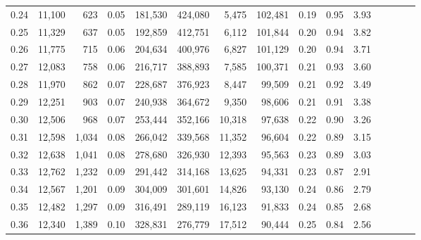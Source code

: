 \begin{tabular}{rrrcrrrrrrrrrrr}
0.24 &  11,100 &    623 &                                       0.05 &  181,530 &  424,080 &    5,475 &  102,481 &  0.19 &  0.95 &                         3.93 \\
0.25 &  11,329 &    637 &                                       0.05 &  192,859 &  412,751 &    6,112 &  101,844 &  0.20 &  0.94 &                         3.82 \\
0.26 &  11,775 &    715 &                                       0.06 &  204,634 &  400,976 &    6,827 &  101,129 &  0.20 &  0.94 &                         3.71 \\
0.27 &  12,083 &    758 &                                       0.06 &  216,717 &  388,893 &    7,585 &  100,371 &  0.21 &  0.93 &                         3.60 \\
0.28 &  11,970 &    862 &                                       0.07 &  228,687 &  376,923 &    8,447 &   99,509 &  0.21 &  0.92 &                         3.49 \\
0.29 &  12,251 &    903 &                                       0.07 &  240,938 &  364,672 &    9,350 &   98,606 &  0.21 &  0.91 &                         3.38 \\
0.30 &  12,506 &    968 &                                       0.07 &  253,444 &  352,166 &   10,318 &   97,638 &  0.22 &  0.90 &                         3.26 \\
0.31 &  12,598 &  1,034 &                                       0.08 &  266,042 &  339,568 &   11,352 &   96,604 &  0.22 &  0.89 &                         3.15 \\
0.32 &  12,638 &  1,041 &                                       0.08 &  278,680 &  326,930 &   12,393 &   95,563 &  0.23 &  0.89 &                         3.03 \\
0.33 &  12,762 &  1,232 &                                       0.09 &  291,442 &  314,168 &   13,625 &   94,331 &  0.23 &  0.87 &                         2.91 \\
0.34 &  12,567 &  1,201 &                                       0.09 &  304,009 &  301,601 &   14,826 &   93,130 &  0.24 &  0.86 &                         2.79 \\
0.35 &  12,482 &  1,297 &                                       0.09 &  316,491 &  289,119 &   16,123 &   91,833 &  0.24 &  0.85 &                         2.68 \\
0.36 &  12,340 &  1,389 &                                       0.10 &  328,831 &  276,779 &   17,512 &   90,444 &  0.25 &  0.84 &                         2.56 \\

\end{tabular}
